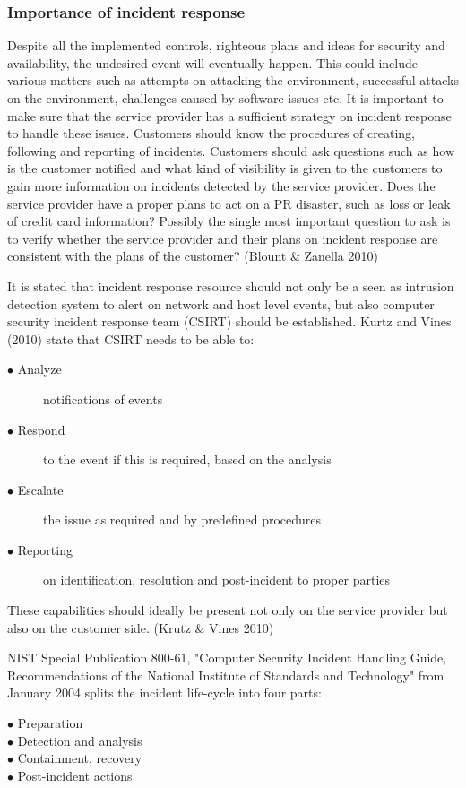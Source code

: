 \documentclass{article}
\begin{document}
\subsubsection{Importance of incident response}
Despite all the implemented controls, righteous plans and ideas for security and availability, the undesired event will eventually happen. This could include various matters such as attempts on attacking the environment, successful attacks on the environment, challenges caused by software issues etc. It is important to make sure that the service provider has a sufficient strategy on incident response to handle these issues. Customers should know the procedures of creating, following and reporting of incidents. Customers should ask questions such as how is the customer notified and what kind of visibility is given to the customers to gain more information on incidents detected by the service provider. Does the service provider have a proper plans to act on a PR disaster, such as loss or leak of credit card information? Possibly the single most important question to ask is to verify whether the service provider and their plans on incident response are consistent with the plans of the customer? (Blount \& Zanella 2010)
\par
It is stated that incident response resource should not only be a seen as intrusion detection system to alert on network and host level events, but also computer security incident response team (CSIRT) should be established. Kurtz and Vines (2010) state that CSIRT needs to be able to:
\begin{description}
	\item[$\bullet$ Analyze] notifications of events
	\item[$\bullet$ Respond] to the event if this is required, based on the analysis
	\item[$\bullet$ Escalate] the issue as required and by predefined procedures
	\item[$\bullet$ Reporting] on identification, resolution and post-incident to proper parties
\end{description}
These capabilities should ideally be present not only on the service provider but also on the customer side. (Krutz \& Vines 2010)
\par
NIST Special Publication 800-61, "Computer Security Incident Handling Guide, Recommendations of the National Institute of Standards and Technology" from January 2004 splits the incident life-cycle into four parts:
\begin{description}
	\item[$\bullet$ Preparation]
	\item[$\bullet$ Detection and analysis]
	\item[$\bullet$ Containment, recovery]
	\item[$\bullet$ Post-incident actions]
\end{description}
\end{document}
